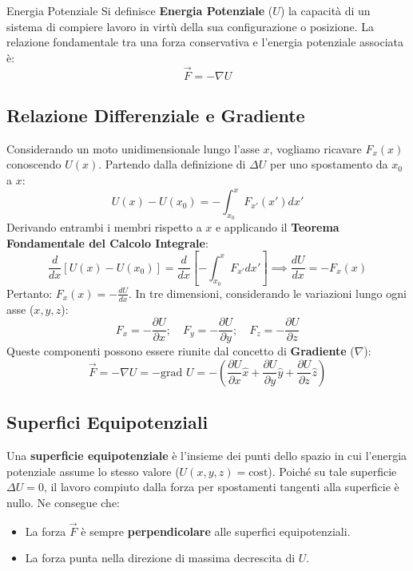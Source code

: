 \begin{definizione}{Energia Potenziale}
Si definisce \textbf{Energia Potenziale} ($U$) la capacità di un sistema di compiere lavoro in virtù della sua configurazione o posizione. La relazione fondamentale tra una forza conservativa e l'energia potenziale associata è:
\begin{equation}
    \vec{F} = -\nabla U
\end{equation}
\end{definizione}

\subsection{Relazione Differenziale e Gradiente}
Considerando un moto unidimensionale lungo l'asse $x$, vogliamo ricavare $F_x(x)$ conoscendo $U(x)$. Partendo dalla definizione di $\Delta U$ per uno spostamento da $x_0$ a $x$:
\begin{equation}
    U(x) - U(x_0) = -\int_{x_0}^x F_{x'}(x') dx'
\end{equation}
Derivando entrambi i membri rispetto a $x$ e applicando il \textbf{Teorema Fondamentale del Calcolo Integrale}:
\begin{equation}
    \frac{d}{dx} [U(x) - U(x_0)] = \frac{d}{dx} \left[ -\int_{x_0}^x F_{x'} dx' \right] \implies \frac{dU}{dx} = -F_x(x)
\end{equation}
Pertanto: $\boxed{F_x(x) = -\frac{dU}{dx}}$. In tre dimensioni, considerando le variazioni lungo ogni asse ($x, y, z$):
\begin{equation}
    F_x = -\frac{\partial U}{\partial x}; \quad F_y = -\frac{\partial U}{\partial y}; \quad F_z = -\frac{\partial U}{\partial z}
\end{equation}
Queste componenti possono essere riunite dal concetto di \textbf{Gradiente} ($\nabla$):
\begin{equation}
    \vec{F} = -\nabla U = -\text{grad } U = -\left( \frac{\partial U}{\partial x} \hat{x} + \frac{\partial U}{\partial y} \hat{y} + \frac{\partial U}{\partial z} \hat{z} \right)
\end{equation}

\subsection{Superfici Equipotenziali}
Una \textbf{superficie equipotenziale} è l'insieme dei punti dello spazio in cui l'energia potenziale assume lo stesso valore ($U(x,y,z) = \text{cost}$). 
Poiché su tale superficie $\Delta U = 0$, il lavoro compiuto dalla forza per spostamenti tangenti alla superficie è nullo. Ne consegue che:
\begin{itemize}
    \item La forza $\vec{F}$ è sempre \textbf{perpendicolare} alle superfici equipotenziali.
    \item La forza punta nella direzione di massima decrescita di $U$.
\end{itemize}

